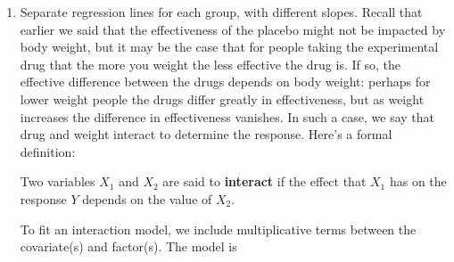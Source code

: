 \documentclass[
]{book}
\begin{document}
\begin{enumerate}
  Writing out the model explicitly for both drug groups will prove enlightening. The model parameters and their interpretations break down as follows:
  \[\begin{array}{ccc} 
  \hline
  \textbf{Drug} & \mathbf{D} & \textbf{Model} \\
  \hline
  placebo & 0 & Y = \beta_0 + \beta_1 X + \beta_2(0) + \varepsilon = \beta_0 + \beta_1 X + \varepsilon \\
  A       & 1 &   Y = \beta_0 + \beta_1 X + \beta_2(1) + \varepsilon = (\beta_0 + \beta_2) + \beta_1 X + \varepsilon \\
  \hline
  \end{array}\]
  You can see that the slope of the model for either drug is the same (\(=\beta_1\)), so the model imposes that body weight has the same effect on glucose reduction regardless of drug. However, the intercept terms differ between the models for the two drugs: it is \(\beta_0\) for placebo, but \(\beta_0 + \beta_2\) for drug \(A\). Since the difference between these two intercepts is \(\beta_2\), its interpretation is that it represents the constant shift in glucose reduction when changing from placebo to drug \(A\). In short, \(\beta_2\) measures the effect of drug regardless of body weight, and \(\beta_1\) measures the effect of body weight regardless of drug. Of course, if the effect of drug truly depends on body weight, then we can't separate their influence on the response; i.e., their effects are not additive. Which leads us to\ldots..
\item
  Separate regression lines for each group, with different slopes. Recall that earlier we said that the effectiveness of the placebo might not be impacted by body weight, but it may be the case that for people taking the experimental drug that the more you weight the less effective the drug is. If so, the effective difference between the drugs depends on body weight: perhaps for lower weight people the drugs differ greatly in effectiveness, but as weight increases the difference in effectiveness vanishes. In such a case, we say that drug and weight interact to determine the response. Here's a formal definition:

  Two variables \(X_1\) and \(X_2\) are said to \textbf{interact} if the effect that \(X_1\) has on the response \(Y\) depends on the value of \(X_2\).

  To fit an interaction model, we include multiplicative terms between the covariate(s) and factor(s). The model is
\end{enumerate}
\end{document}

